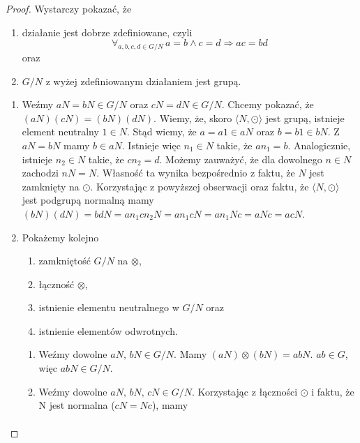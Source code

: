 \documentclass[declaration,shortabstract]{iithesis}
\theoremstyle{definition}
\theoremstyle{remark} \newtheorem{observation}{Obserwacja}
\theoremstyle{plain} \newtheorem{theorem}{Twierdzenie}
\theoremstyle{plain} \newtheorem{lemma}{Lemat}
\theoremstyle{remark} \newtheorem*{remark*}{Uwaga}
\theoremstyle{reminder} \newtheorem*{reminder*}{Przypomnienie}
\begin{document}
\begin{proof}
	Wystarczy pokazać, że 
	\begin{enumerate}[label=\arabic*., leftmargin=.4in]
		\item działanie jest dobrze zdefiniowane, czyli \[\forall_{a, b, c, d \in G/N} \, a = b \wedge c = d \Rightarrow ac = bd\] oraz 
		\item $G/N$ z wyżej zdefiniowanym działaniem jest grupą.
	\end{enumerate}
	\begin{enumerate}[label=Ad.\arabic*., leftmargin=.4in]
		\item Weźmy $aN = bN \in G/N$ oraz $cN = dN \in G/N$. Chcemy pokazać, że $(aN)(cN) = (bN)(dN)$. Wiemy, że, skoro $\langle N, \odot \rangle$ jest grupą, istnieje element neutralny $1 \in N$. Stąd wiemy, że $a = a1 \in aN$ oraz $b = b1 \in bN$. Z $aN = bN$ mamy $b \in aN$. Istnieje więc $n_1 \in N$ takie, że $an_1 = b$. Analogicznie, istnieje $n_2 \in N$ takie, że $cn_2 = d$.\newline
		      \newline
		      Możemy zauważyć, że dla dowolnego $n \in N$ zachodzi $nN = N$. Własność ta wynika bezpośrednio z faktu, że $N$ jest zamknięty na $\odot$.\newline
		      \newline
		      Korzystając z powyższej obserwacji oraz faktu, że $\langle N, \odot \rangle$ jest podgrupą normalną mamy $(bN)(dN) = bdN = an_1cn_2N = an_1cN = an_1Nc = aNc = acN$.\newline
		\item Pokażemy kolejno
		      \begin{enumerate}[label=2.\arabic*.]
		      	\item zamkniętość $G/N$ na $\otimes$, 
		      	\item łączność $\otimes$, 
		      	\item istnienie elementu neutralnego w $G/N$ oraz 
		      	\item istnienie elementów odwrotnych.
		      \end{enumerate}
		      \begin{enumerate}[label=Ad.2.\arabic*.]
		      	\item Weźmy dowolne $aN, \, bN \in G/N$. Mamy $(aN)\otimes(bN) = abN$. $ab \in G$, więc $abN \in G/N$.
		      	\item Weźmy dowolne $aN, \, bN, \, cN \in G/N$. Korzystając z łączności $\odot$ i faktu, że N jest normalna ($cN = Nc$), mamy 
		      	      \begin{align}

\end{align}
\end{enumerate}
\end{enumerate}
\end{proof}
\end{document}
